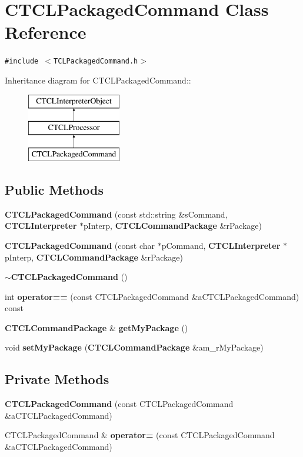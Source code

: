 \section{CTCLPackaged\-Command  Class Reference}
\label{classCTCLPackagedCommand}
{\tt \#include $<$TCLPackaged\-Command.h$>$}

Inheritance diagram for CTCLPackaged\-Command::\begin{figure}[H]
\begin{center}
\leavevmode
\includegraphics[height=3cm]{classCTCLPackagedCommand}
\end{center}
\end{figure}
\subsection*{Public Methods}
\begin{CompactItemize}
\item 
{\bf CTCLPackaged\-Command} (const std::string \&s\-Command, {\bf CTCLInterpreter} $\ast$p\-Interp, {\bf CTCLCommand\-Package} \&r\-Package)
\item 
{\bf CTCLPackaged\-Command} (const char $\ast$p\-Command, {\bf CTCLInterpreter} $\ast$p\-Interp, {\bf CTCLCommand\-Package} \&r\-Package)
\item 
{\bf $\sim$CTCLPackaged\-Command} ()
\item 
int {\bf operator==} (const CTCLPackaged\-Command \&a\-CTCLPackaged\-Command) const
\item 
{\bf CTCLCommand\-Package} \& {\bf get\-My\-Package} ()
\item 
void {\bf set\-My\-Package} ({\bf CTCLCommand\-Package} \&am\_\-r\-My\-Package)
\end{CompactItemize}
\subsection*{Private Methods}
\begin{CompactItemize}
\item 
{\bf CTCLPackaged\-Command} (const CTCLPackaged\-Command \&a\-CTCLPackaged\-Command)
\item 
CTCLPackaged\-Command \& {\bf operator=} (const CTCLPackaged\-Command \&a\-CTCLPackaged\-Command)
\end{CompactItemize}

